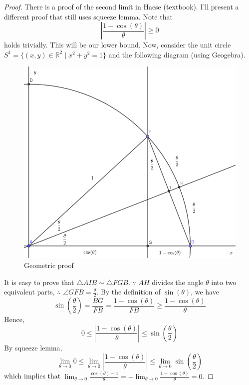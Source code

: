 \documentclass{article}
\theoremstyle{definition}
\theoremstyle{definition}
\theoremstyle{definition}
\theoremstyle{definition}
\theoremstyle{definition}
\theoremstyle{definition}
\theoremstyle{definition}
\theoremstyle{definition}
\theoremstyle{definition}
\begin{document}
\begin{proof}
There is a proof of the second limit in Haese (textbook). I'll present a different proof that still uses squeeze lemma. Note that \[
\left|\dfrac{1-\cos(\theta)}{\theta}\right|\ge 0
\]
holds trivially. This will be our lower bound.
Now, consider the unit circle $S^1=\{(x,y)\in\mathbb{R}^2\mid x^2+y^2=1\}$ and the following diagram (using Geogebra).
\begin{figure}[H]
    \centering
    \includegraphics[scale=0.6]{Pictures/Trig_limit.PNG}
    \caption{Geometric proof}
    \label{fig:my_label}
\end{figure}
It is easy to prove that $\triangle AIB\sim \triangle FGB$. $\because$ $AH$ divides the angle $\theta$ into two equivalent parts, $\therefore$ $\angle GFB=\frac{\theta}{2}$. By the definition of $\sin(\theta)$, we have 
\[
\sin\left(\dfrac{\theta}{2}\right)=\dfrac{BG}{FB}=\dfrac{1-\cos(\theta)}{FB}\ge \dfrac{1-\cos(\theta)}{\theta}
\]
Hence,
\begin{equation}
    0\le\left|\dfrac{1-\cos(\theta)}{\theta}\right|\le \sin\left(\dfrac{\theta}{2}\right)
\end{equation}
By squeeze lemma, 
\begin{equation}
    \lim_{\theta\to0}0\le\lim_{\theta\to0}\left|\dfrac{1-\cos(\theta)}{\theta}\right|\le \lim_{\theta\to0}\sin\left(\dfrac{\theta}{2}\right)
\end{equation}
which implies that $\lim_{\theta\to0}\frac{\cos(\theta)-1}{\theta}=-\lim_{\theta\to0}\frac{1-\cos(\theta)}{\theta}=0$.
\end{proof}
\end{document}
